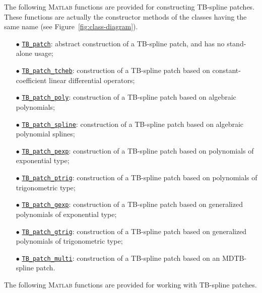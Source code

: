 \documentclass[10pt]{acmtrans2e}
\newcommand{\Matlab}{\textsc{Matlab}}
\begin{document}
The following \Matlab{} functions are provided for constructing TB-spline patches. These functions are actually the constructor methods of the classes having the same name (see Figure~\ref{fig:class-diagram}).
\begin{itemize}
  \item[$\bullet$] \hyperref[sec:matlab-tb-patch]{\texttt{TB\_patch}}: 
     abstract construction of a TB-spline patch, and has no stand-alone usage;
  \item[$\bullet$] \hyperref[sec:matlab-tb-patch-tcheb]{\texttt{TB\_patch\_tcheb}}: 
     construction of a TB-spline patch based on constant-coefficient linear differential operators;
  \item[$\bullet$] \hyperref[sec:matlab-tb-patch-poly]{\texttt{TB\_patch\_poly}}: 
     construction of a TB-spline patch based on algebraic polynomials;
  \item[$\bullet$] \hyperref[sec:matlab-tb-patch-spline]{\texttt{TB\_patch\_spline}}: 
     construction of a TB-spline patch based on algebraic polynomial splines;
  \item[$\bullet$] \hyperref[sec:matlab-tb-patch-pexp]{\texttt{TB\_patch\_pexp}}: 
     construction of a TB-spline patch based on polynomials of exponential type;
  \item[$\bullet$] \hyperref[sec:matlab-tb-patch-ptrig]{\texttt{TB\_patch\_ptrig}}: 
     construction of a TB-spline patch based on polynomials of trigonometric type;
  \item[$\bullet$] \hyperref[sec:matlab-tb-patch-gexp]{\texttt{TB\_patch\_gexp}}: 
     construction of a TB-spline patch based on generalized polynomials of exponential type;
  \item[$\bullet$] \hyperref[sec:matlab-tb-patch-gtrig]{\texttt{TB\_patch\_gtrig}}: 
     construction of a TB-spline patch based on generalized polynomials of trigonometric type;
  \item[$\bullet$] \hyperref[sec:matlab-tb-patch-multi]{\texttt{TB\_patch\_multi}}: 
     construction of a TB-spline patch based on an MDTB-spline patch.
\end{itemize}
The following \Matlab{} functions are provided for working with TB-spline patches.
\end{document}
